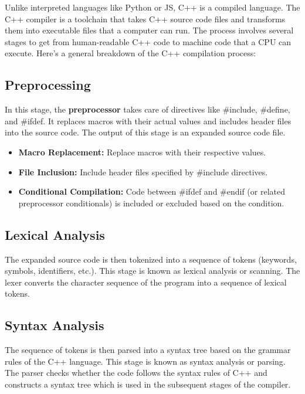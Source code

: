 \documentclass{report}
\begin{document}
    \pagebreak
    \bigbreak \noindent 
    Unlike interpreted languages like Python or JS, C++ is a compiled language. The C++ compiler is a toolchain that takes C++ source code files and transforms them into executable files that a computer can run. The process involves several stages to get from human-readable C++ code to machine code that a CPU can execute.
    \bigbreak \noindent 
    Here's a general breakdown of the C++ compilation process:
    \bigbreak \noindent 
    \subsection{Preprocessing}
    \bigbreak \noindent 
    In this stage, the \textbf{preprocessor} takes care of directives like \#include, \#define, and \#ifdef. It replaces macros with their actual values and includes header files into the source code. The output of this stage is an expanded source code file.
    \begin{itemize}
        \item \textbf{Macro Replacement:} Replace macros with their respective values.
        \item \textbf{File Inclusion:} Include header files specified by \#include directives.
        \item \textbf{Conditional Compilation:} Code between \#ifdef and \#endif (or related preprocessor conditionals) is included or excluded based on the condition.
    \end{itemize}

    \bigbreak \noindent 
    \subsection{Lexical Analysis}
    \bigbreak \noindent 
    The expanded source code is then tokenized into a sequence of tokens (keywords, symbols, identifiers, etc.). This stage is known as lexical analysis or scanning. The lexer converts the character sequence of the program into a sequence of lexical tokens.

    \bigbreak \noindent 
    \subsection{Syntax Analysis}
    \bigbreak \noindent 
    The sequence of tokens is then parsed into a syntax tree based on the grammar rules of the C++ language. This stage is known as syntax analysis or parsing. The parser checks whether the code follows the syntax rules of C++ and constructs a syntax tree which is used in the subsequent stages of the compiler.
\end{document}
